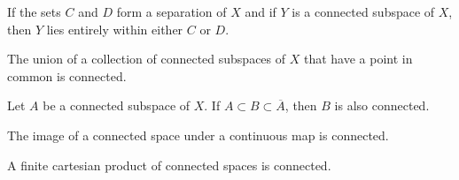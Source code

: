 \begin{lemma}
If the sets $C$ and $D$ form a separation of $X$ and if $Y$ is a connected subspace of $X$, then $Y$ lies entirely
within either $C$ or $D$.
\end{lemma}

\begin{theorem}
The union of a collection of connected subspaces of $X$ that have a point in common is connected.
\end{theorem}

\begin{theorem}
Let $A$ be a connected subspace of $X$. If $A \subset B \subset \overline{A}$, then $B$ is also connected.
\end{theorem}

\begin{theorem}
The image of a connected space under a continuous map is connected.
\end{theorem}

\begin{theorem}
A finite cartesian product of connected spaces is connected.    
\end{theorem}